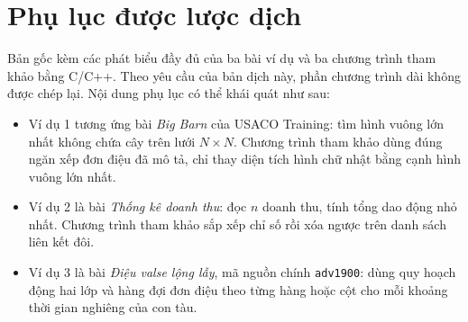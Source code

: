 \documentclass[11pt]{article}
\begin{document}
\section*{Phụ lục được lược dịch}

Bản gốc kèm các phát biểu đầy đủ của ba bài ví dụ và ba chương trình tham
khảo bằng C/C++. Theo yêu cầu của bản dịch này, phần chương trình dài không
được chép lại. Nội dung phụ lục có thể khái quát như sau:
\begin{itemize}
  \item Ví dụ 1 tương ứng bài \textit{Big Barn} của USACO Training: tìm hình
  vuông lớn nhất không chứa cây trên lưới \(N\times N\). Chương trình tham
  khảo dùng đúng ngăn xếp đơn điệu đã mô tả, chỉ thay diện tích hình chữ nhật
  bằng cạnh hình vuông lớn nhất.
  \item Ví dụ 2 là bài \textit{Thống kê doanh thu}: đọc \(n\) doanh thu, tính
  tổng dao động nhỏ nhất. Chương trình tham khảo sắp xếp chỉ số rồi xóa ngược
  trên danh sách liên kết đôi.
  \item Ví dụ 3 là bài \textit{Điệu valse lộng lẫy}, mã nguồn chính
  \texttt{adv1900}: dùng quy hoạch động hai lớp và hàng đợi đơn điệu theo từng
  hàng hoặc cột cho mỗi khoảng thời gian nghiêng của con tàu.
\end{itemize}
\end{document}
